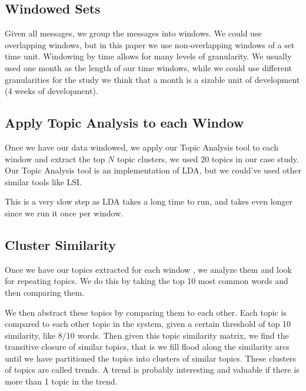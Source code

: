 \documentclass[times, 10pt,twocolumn]{article}
\begin{document}
\subsection{Windowed Sets}

Given all messages, we group the messages into windows. We could use
overlapping windows, but in this paper we use non-overlapping windows
of a set time unit.  Windowing by time allows for many levels of
granularity. We usually used one month as the length of our time
windows, while we could use different granularities for the study we
think that a month is a sizable unit of development (4 weeks of
development).


\subsection{Apply Topic Analysis to each Window}

Once we have our data windowed, we apply our Topic Analysis tool to
each window and extract the top $N$ topic clusters, we used $20$
topics in our case study. Our Topic Analysis tool is an implementation
of LDA, but we could've used other similar tools like LSI.

This is a very slow step as LDA takes a long time to run, and takes
even longer since we run it once per window.





\subsection{Cluster Similarity}


Once we have our topics extracted for each window , we analyze them
and look for repeating topics. We do this by taking the top 10 most
common words and then comparing them. 

We then abstract these topics by comparing them to each other.  Each
topic is compared to each other topic in the system, given a certain
threshold of top 10 similarity, like 8/10 words. Then given this topic
similarity matrix, we find the transitive closure of similar topics,
that is we fill flood along the similarity arcs until we have
partitioned the topics into clusters of similar topics.  These
clusters of topics are called trends. A trend is probably interesting
and valuable if there is more than 1 topic in the trend.
\end{document}

